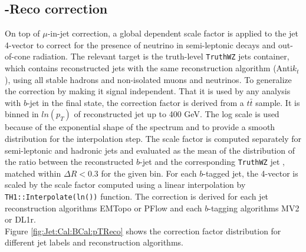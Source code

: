 \subsection{\pT-Reco correction}
\label{Jet:Cal:BCal:pTReco}
On top of $\mu$-in-jet correction, a global \pT dependent scale factor is applied to the jet 4-vector to correct for the presence of neutrino in semi-leptonic decays and out-of-cone radiation. The relevant target is the truth-level \texttt{TruthWZ} jets container, which contains reconstructed jets with the same reconstruction algorithm (Anti$k_t$), using all stable hadrons and non-isolated muons and neutrinos. To generalize the correction by making it signal independent. That it is used by any analysis with $b$-jet in the final state, the correction factor is derived from a $t\bar{t}$ sample. It is binned in $ln(p_T)$ of reconstructed jet up to 400 GeV. The log scale is used because of the exponential shape of the \pT spectrum and to provide a smooth distribution for the interpolation step. The scale factor is computed separately for semi-leptonic and hadronic jets and evaluated as the mean of the distribution of the ratio between the reconstructed $b$-jet \pT and the corresponding \texttt{TruthWZ} jet \pT, matched within $\Delta R < 0.3$ for the given \pT bin. For each $b$-tagged jet, the 4-vector is scaled by the scale factor computed using a linear interpolation by \texttt{TH1::Interpolate(ln(\pT))} function. The correction is derived for each jet reconstruction algorithms EMTopo or PFlow and each $b$-tagging algorithms MV2 or DL1r. \\
Figure \ref{fig:Jet:Cal:BCal:pTReco} shows the correction factor distribution for different jet labels and reconstruction algorithms. 
